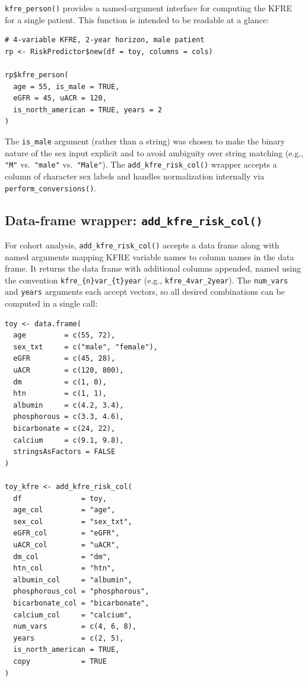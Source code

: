 \texttt{kfre\_person()} provides a named-argument interface for computing the KFRE for
a single patient. This function is intended to be readable at a glance:

\begin{verbatim}
# 4-variable KFRE, 2-year horizon, male patient
rp <- RiskPredictor$new(df = toy, columns = cols)

rp$kfre_person(
  age = 55, is_male = TRUE,
  eGFR = 45, uACR = 120,
  is_north_american = TRUE, years = 2
)
\end{verbatim}

The \texttt{is\_male} argument (rather than a string) was chosen to make the binary
nature of the sex input explicit and to avoid ambiguity over string matching
(e.g., \texttt{"M"} vs.~\texttt{"male"} vs.~\texttt{"Male"}). The \texttt{add\_kfre\_risk\_col()} wrapper
accepts a column of character sex labels and handles normalization internally
via \texttt{perform\_conversions()}.

\subsection{\texorpdfstring{Data-frame wrapper: \texttt{add\_kfre\_risk\_col()}}{Data-frame wrapper: add\_kfre\_risk\_col()}}\label{data-frame-wrapper-add_kfre_risk_col}

For cohort analysis, \texttt{add\_kfre\_risk\_col()} accepts a data frame along with
named arguments mapping KFRE variable names to column names in the data frame.
It returns the data frame with additional columns appended, named using the
convention \texttt{kfre\_\{n\}var\_\{t\}year} (e.g., \texttt{kfre\_4var\_2year}). The \texttt{num\_vars} and
\texttt{years} arguments each accept vectors, so all desired combinations can be
computed in a single call:

\begin{verbatim}
toy <- data.frame(
  age         = c(55, 72),
  sex_txt     = c("male", "female"),
  eGFR        = c(45, 28),
  uACR        = c(120, 800),
  dm          = c(1, 0),
  htn         = c(1, 1),
  albumin     = c(4.2, 3.4),
  phosphorous = c(3.3, 4.6),
  bicarbonate = c(24, 22),
  calcium     = c(9.1, 9.8),
  stringsAsFactors = FALSE
)

toy_kfre <- add_kfre_risk_col(
  df              = toy,
  age_col         = "age",
  sex_col         = "sex_txt",
  eGFR_col        = "eGFR",
  uACR_col        = "uACR",
  dm_col          = "dm",
  htn_col         = "htn",
  albumin_col     = "albumin",
  phosphorous_col = "phosphorous",
  bicarbonate_col = "bicarbonate",
  calcium_col     = "calcium",
  num_vars        = c(4, 6, 8),
  years           = c(2, 5),
  is_north_american = TRUE,
  copy            = TRUE
)
\end{verbatim}

